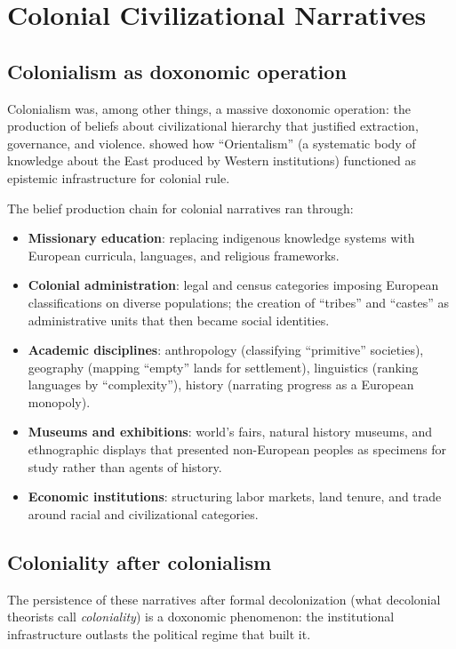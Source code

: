 \section{Colonial Civilizational Narratives}
\label{sec:ch24b-coloniality}

\subsection{Colonialism as doxonomic operation}

Colonialism was, among other things, a massive doxonomic operation: the production of beliefs about civilizational hierarchy that justified extraction, governance, and violence.
\textcite{said1978} showed how ``Orientalism'' (a systematic body of knowledge about the East produced by Western institutions) functioned as epistemic infrastructure for colonial rule.

The belief production chain for colonial narratives ran through:
\begin{itemize}[nosep]
  \item \textbf{Missionary education}: replacing indigenous knowledge systems with European curricula, languages, and religious frameworks.
  \item \textbf{Colonial administration}: legal and census categories imposing European classifications on diverse populations; the creation of ``tribes'' and ``castes'' as administrative units that then became social identities.
  \item \textbf{Academic disciplines}: anthropology (classifying ``primitive'' societies), geography (mapping ``empty'' lands for settlement), linguistics (ranking languages by ``complexity''), history (narrating progress as a European monopoly).
  \item \textbf{Museums and exhibitions}: world's fairs, natural history museums, and ethnographic displays that presented non-European peoples as specimens for study rather than agents of history.
  \item \textbf{Economic institutions}: structuring labor markets, land tenure, and trade around racial and civilizational categories.
\end{itemize}

\subsection{Coloniality after colonialism}

The persistence of these narratives after formal decolonization (what decolonial theorists call \emph{coloniality}) is a doxonomic phenomenon: the institutional infrastructure outlasts the political regime that built it.

